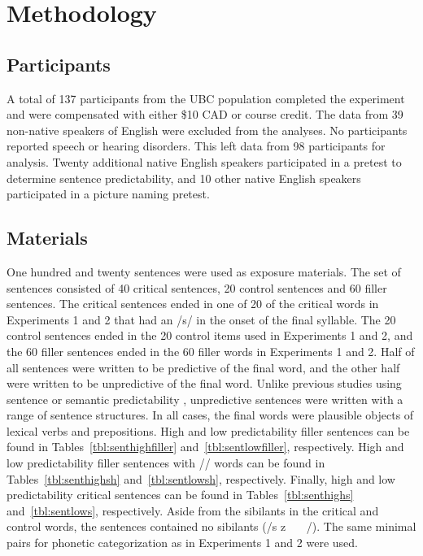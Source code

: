 \section{Methodology}

\subsection{Participants}

A total of 137 participants from the UBC population completed the experiment and were compensated with either \$10 CAD or course credit.  
The data from 39 non-native speakers of English were excluded from the analyses.
No participants reported speech or hearing disorders.
This left data from 98 participants for analysis.
Twenty additional native English speakers participated in a pretest to determine sentence predictability, and 10 other native English speakers participated in a picture naming pretest.

\subsection{Materials}

One hundred and twenty sentences were used as exposure materials.  
The set of sentences consisted of 40 critical sentences, 20 control sentences and 60 filler sentences. 
The critical sentences ended in one of 20 of the critical words in Experiments 1 and 2 that had an /s/ in the onset of the final syllable.  
The 20 control sentences ended in the 20 control items used in Experiments 1 and 2, and the 60 filler sentences ended in the 60 filler words in Experiments 1 and 2.  
Half of all sentences were written to be predictive of the final word, and the other half were written to be unpredictive of the final word.  
Unlike previous studies using sentence or semantic predictability \citep{Kalikow1977}, unpredictive sentences were written with a range of sentence structures.
In all cases, the final words were plausible objects of lexical verbs and prepositions.
High and low predictability filler sentences can be found in Tables~\ref{tbl:senthighfiller} and~\ref{tbl:sentlowfiller}, respectively.
High and low predictability filler sentences with /\textesh/ words can be found in Tables~\ref{tbl:senthighsh} and~\ref{tbl:sentlowsh}, respectively.
Finally, high and low predictability critical sentences can be found in Tables~\ref{tbl:senthighs} and~\ref{tbl:sentlows}, respectively.
Aside from the sibilants in the critical and control words, the sentences contained no sibilants (/s z \textesh\ \textyogh\ \textteshlig\  \textdyoghlig/).  
The same minimal pairs for phonetic categorization as in Experiments 1 and 2 were used.

